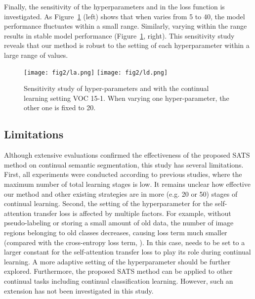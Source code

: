 \documentclass[onecolumn,conference,compsoc]{IEEEtran}
\begin{document}
\begin{spacing}{1.5}
\begin{table*}[t]
\label{tab:ablation2}
\end{table*}

Finally, the sensitivity of the hyperparameters  and  in the loss function {is investigated.} As Figure~\ref{fig:hyper-param-curve} (left) shows that when  varies from 5 to 40, the model performance fluctuates within a small range. Similarly, varying  within the range  results in stable model performance (Figure~\ref{fig:hyper-param-curve}, right). This sensitivity study {reveals} that our method is robust to the setting of each hyperparameter within a large range of values.




\begin{figure}[h]
  \centering
\texttt{[image: fig2/la.png]}
  \texttt{[image: fig2/ld.png]}
  \vspace{-0.2cm}
    \caption{Sensitivity study of hyper-parameters   and  with the continual learning setting VOC 15-1. When varying one hyper-parameter, the other one is fixed to 20. 
  }
  \label{fig:hyper-param-curve}
\end{figure}

\subsection{Limitations}

Although extensive evaluations confirmed the effectiveness of the proposed SATS method on continual semantic segmentation, this study {has several limitations.} First, all experiments {were conducted according to} previous studies, where the maximum number of total learning stages {is} low.  It remains unclear 
how effective our method and other existing strategies are in more (e.g. 20 or 50) stages of continual learning. Second, the setting of the hyperparameter  for the self-attention transfer loss  is affected by multiple factors. For example, without pseudo-labeling or storing a small amount of old data, the number of image regions belonging to old classes {decreases,} causing loss term  much smaller (compared with the cross-entropy loss term, ). In this case,  needs to be set to a larger constant for the self-attention transfer loss  to play its role during continual learning. A more adaptive setting of the hyperparameter  should be further explored. {Furthermore,} the proposed SATS method can be applied to other continual tasks including continual classification learning. {However, such an} extension has not been investigated in this study.


\end{spacing}
\end{document}
